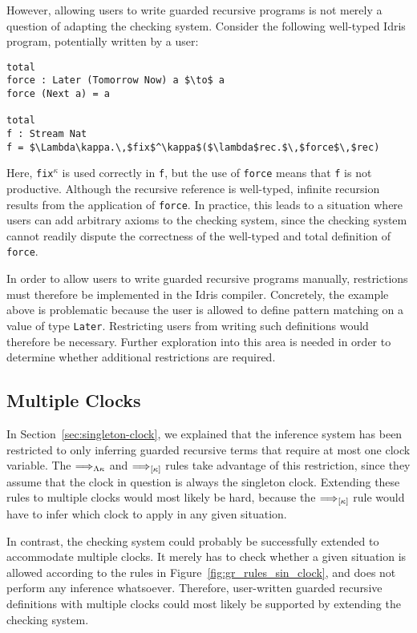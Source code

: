 However, allowing users to write guarded recursive programs is not merely a
question of adapting the checking system. Consider the following well-typed
Idris program, potentially written by a user:
\begin{lstlisting}[mathescape, title=\idrisBlock]
total 
force : Later (Tomorrow Now) a $\to$ a
force (Next a) = a

total 
f : Stream Nat
f = $\Lambda\kappa.\,$fix$^\kappa$($\lambda$rec.$\,$force$\,$rec)
\end{lstlisting}
Here, \texttt{fix$^\kappa$} is used correctly in \texttt{f}, but the use of
\texttt{force} means that \texttt{f} is not productive. Although the recursive
reference is well-typed, infinite recursion results from the application of
\texttt{force}. In practice, this leads to a situation where users can add
arbitrary axioms to the checking system, since the checking system cannot
readily dispute the correctness of the well-typed and total definition of
\texttt{force}.

In order to allow users to write guarded recursive programs manually,
restrictions must therefore be implemented in the Idris compiler. Concretely,
the example above is problematic because the user is allowed to define pattern
matching on a value of type \texttt{Later}. Restricting users from writing such
definitions would therefore be necessary. Further exploration into this area is
needed in order to determine whether additional restrictions are required.

\subsection{Multiple Clocks}
\label{sec:multiple-clocks}
In Section~\ref{sec:singleton-clock}, we explained that the inference system has
been restricted to only inferring guarded recursive terms that require at most
one clock variable. The $\Longrightarrow_{\Lambda\kappa}$ and $\Longrightarrow_{[\kappa]}$ rules
take advantage of this restriction, since they assume that the clock in question
is always the singleton clock. Extending these rules to multiple clocks would
most likely be hard, because the $\Longrightarrow_{[\kappa]}$ rule would have to infer
which clock to apply in any given situation.

In contrast, the checking system could probably be successfully extended to
accommodate multiple clocks. It merely has to check whether a given situation is
allowed according to the rules in Figure~\ref{fig:gr_rules_sin_clock}, and does
not perform any inference whatsoever. Therefore, user-written guarded recursive
definitions with multiple clocks could most likely be supported by extending the
checking system.


